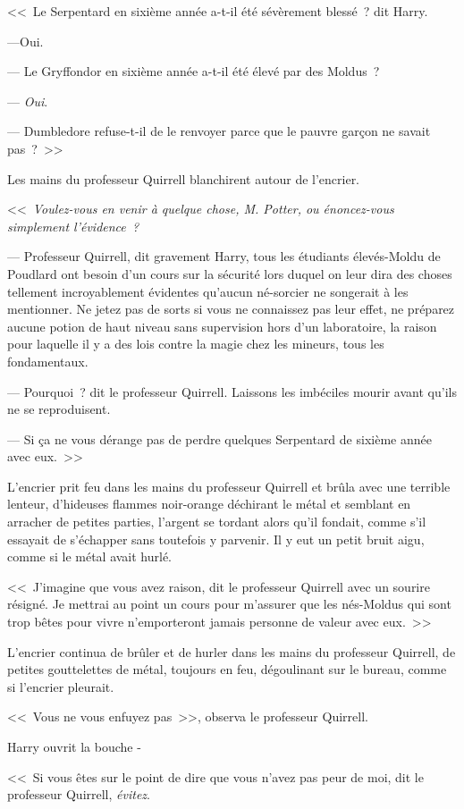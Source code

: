 <<~Le Serpentard en sixième année a-t-il été sévèrement blessé~? dit Harry.

---Oui.

--- Le Gryffondor en sixième année a-t-il été élevé par des Moldus~?

--- \emph{Oui}.

--- Dumbledore refuse-t-il de le renvoyer parce que le pauvre garçon ne savait pas~?~>>

Les mains du professeur Quirrell blanchirent autour de l'encrier.

<<~\emph{Voulez-vous en venir à quelque chose, M. Potter, ou énoncez-vous simplement l'évidence~?}

--- Professeur Quirrell, dit gravement Harry, tous les étudiants élevés-Moldu de Poudlard ont besoin d'un cours sur la sécurité lors duquel on leur dira des choses tellement incroyablement évidentes qu'aucun né-sorcier ne songerait à les mentionner. Ne jetez pas de sorts si vous ne connaissez pas leur effet, ne préparez aucune potion de haut niveau sans supervision hors d'un laboratoire, la raison pour laquelle il y a des lois contre la magie chez les mineurs, tous les fondamentaux.

--- Pourquoi~? dit le professeur Quirrell. Laissons les imbéciles mourir avant qu'ils ne se reproduisent.

--- Si ça ne vous dérange pas de perdre quelques Serpentard de sixième année avec eux.~>>

L'encrier prit feu dans les mains du professeur Quirrell et brûla avec une terrible lenteur, d'hideuses flammes noir-orange déchirant le métal et semblant en arracher de petites parties, l'argent se tordant alors qu'il fondait, comme s'il essayait de s'échapper sans toutefois y parvenir. Il y eut un petit bruit aigu, comme si le métal avait hurlé.

<<~J'imagine que vous avez raison, dit le professeur Quirrell avec un sourire résigné. Je mettrai au point un cours pour m'assurer que les nés-Moldus qui sont trop bêtes pour vivre n'emporteront jamais personne de valeur avec eux.~>>

L'encrier continua de brûler et de hurler dans les mains du professeur Quirrell, de petites gouttelettes de métal, toujours en feu, dégoulinant sur le bureau, comme si l'encrier pleurait.

<<~Vous ne vous enfuyez pas~>>, observa le professeur Quirrell.

Harry ouvrit la bouche -

<<~Si vous êtes sur le point de dire que vous n'avez pas peur de moi, dit le professeur Quirrell, \emph{évitez}.

